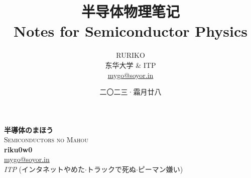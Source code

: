 \documentclass{report}
\title{\Huge\textbf{半导体物理笔记}\\ \vspace{1ex}\LARGE Notes for Semiconductor Physics}
\author{\Large RURIKO\vspace{2ex} \\ \vspace{2ex}东华大学 \& ITP \\ \href{mailto:mygo@soyor.in}{mygo@soyor.in}}
\date{二〇二三·霜月廿八}
\numberwithin{equation}{section}
\begin{document}
\begin{titlepage}
\begin{center}
  {\Huge\mincho \bfseries 半導体のまほう}\\[2ex]
  \textsc{\LARGE Semiconductors no Mahou}\\[6.5ex]
  {\large\bfseries riku0w0}           \\
  \vspace{4ex}
  \href{mailto:mygo@soyor.in}{mygo@soyor.in}                    \\[5pt]
  \textit{ITP} (\mincho インタネットやめた$\cdot$トラックで死ぬ$\cdot$ピーマン嫌い)                \\[0.8cm]
  \begin{figure}[H]
      \centering
\iffalse
{} %

\begin{tikzpicture}[x=0.75pt,y=0.75pt,yscale=-1,xscale=1]


\end{tikzpicture}
\end{figure}
\end{center}
\end{titlepage}
\end{document}
